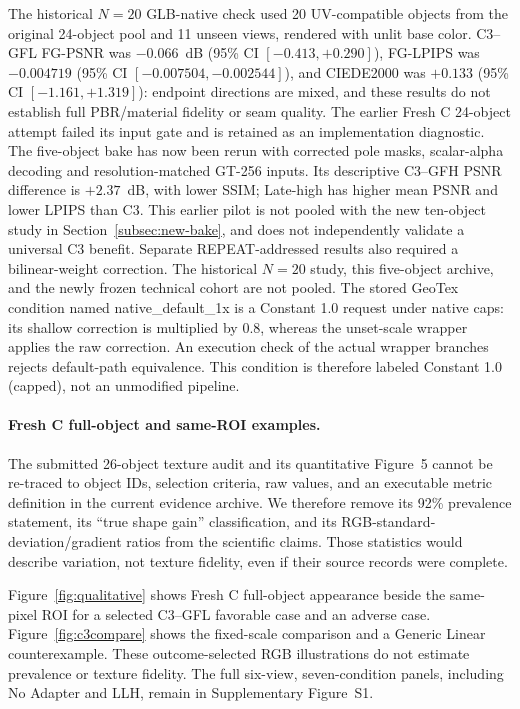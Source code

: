 \documentclass[times,twocolumn,final]{elsarticle}
\begin{document}
The historical $N=20$ GLB-native check used 20 UV-compatible objects from the original 24-object pool and 11 unseen views, rendered with unlit base color. C3--GFL FG-PSNR was $-0.066$~dB (95\% CI $[-0.413,+0.290]$), FG-LPIPS was $-0.004719$ (95\% CI $[-0.007504,-0.002544]$), and CIEDE2000 was $+0.133$ (95\% CI $[-1.161,+1.319]$): endpoint directions are mixed, and these results do not establish full PBR/material fidelity or seam quality. The earlier Fresh C 24-object attempt failed its input gate and is retained as an implementation diagnostic. The five-object bake has now been rerun with corrected pole masks, scalar-alpha decoding and resolution-matched GT-256 inputs. Its descriptive C3--GFH PSNR difference is $+2.37$~dB, with lower SSIM; Late-high has higher mean PSNR and lower LPIPS than C3. This earlier pilot is not pooled with the new ten-object study in Section~\ref{subsec:new-bake}, and does not independently validate a universal C3 benefit. Separate REPEAT-addressed results also required a bilinear-weight correction. The historical $N=20$ study, this five-object archive, and the newly frozen technical cohort are not pooled. The stored GeoTex condition named native\_default\_1x is a Constant 1.0 request under native caps: its shallow correction is multiplied by 0.8, whereas the unset-scale wrapper applies the raw correction. An execution check of the actual wrapper branches rejects default-path equivalence. This condition is therefore labeled Constant 1.0 (capped), not an unmodified pipeline.

\paragraph{Fresh C full-object and same-ROI examples.}
\label{subsec:visual}

The submitted 26-object texture audit and its quantitative Figure~5 cannot be re-traced to object IDs, selection criteria, raw values, and an executable metric definition in the current evidence archive. We therefore remove its 92\% prevalence statement, its “true shape gain” classification, and its RGB-standard-deviation/gradient ratios from the scientific claims. Those statistics would describe variation, not texture fidelity, even if their source records were complete.

Figure~\ref{fig:qualitative} shows Fresh C full-object appearance beside the same-pixel ROI for a selected C3--GFL favorable case and an adverse case. Figure~\ref{fig:c3compare} shows the fixed-scale comparison and a Generic Linear counterexample. These outcome-selected RGB illustrations do not estimate prevalence or texture fidelity. The full six-view, seven-condition panels, including No Adapter and LLH, remain in Supplementary Figure~S1.
\end{document}
